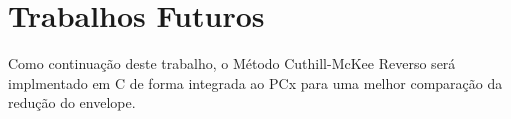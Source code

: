 \section{Trabalhos Futuros}
Como continuação deste trabalho, o Método Cuthill-McKee Reverso será implmentado
em C de forma integrada ao PCx para uma melhor comparação da redução do envelope.
